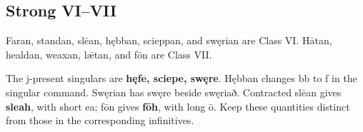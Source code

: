 \subsection*{Strong VI–VII}

Faran, standan, slēan, hębban, scieppan, and swęrian are Class VI. Hātan, healdan, weaxan, lǣtan, and fōn are Class VII.

The j-present singulars are \textbf{hęfe, sciepe, swęre}. Hębban changes bb to f in the singular command. Swęrian has swęre beside swęriað. Contracted slēan gives \textbf{sleah}, with short ea; fōn gives \textbf{fōh}, with long ō. Keep these quantities distinct from those in the corresponding infinitives.

